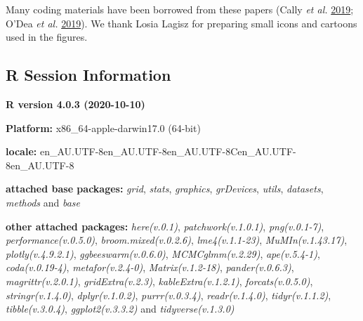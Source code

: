 \documentclass[
]{article}
\newenvironment{Shaded}{\begin{snugshade}}{\end{snugshade}}
\newcommand{\CommentTok}[1]{\textcolor[rgb]{0.56,0.35,0.01}{\textit{#1}}}
\newcommand{\KeywordTok}[1]{\textcolor[rgb]{0.13,0.29,0.53}{\textbf{#1}}}
\newcommand{\NormalTok}[1]{#1}
\newcommand{\OperatorTok}[1]{\textcolor[rgb]{0.81,0.36,0.00}{\textbf{#1}}}
\newcommand{\StringTok}[1]{\textcolor[rgb]{0.31,0.60,0.02}{#1}}
\begin{document}
Many coding materials have been borrowed from these papers (Cally
\emph{et al.} \protect\hyperlink{ref-cally2019meta}{2019}; O'Dea
\emph{et al.} \protect\hyperlink{ref-odea2018developmental}{2019}). We
thank Losia Lagisz for preparing small icons and cartoons used in the
figures.

\hypertarget{r-session-information}{%
\subsection{R Session Information}\label{r-session-information}}

\begin{Shaded}
\end{Shaded}

\textbf{R version 4.0.3 (2020-10-10)}

\textbf{Platform:} x86\_64-apple-darwin17.0 (64-bit)

\textbf{locale:}
en\_AU.UTF-8\textbar\textbar en\_AU.UTF-8\textbar\textbar en\_AU.UTF-8\textbar\textbar C\textbar\textbar en\_AU.UTF-8\textbar\textbar en\_AU.UTF-8

\textbf{attached base packages:} \emph{grid}, \emph{stats},
\emph{graphics}, \emph{grDevices}, \emph{utils}, \emph{datasets},
\emph{methods} and \emph{base}

\textbf{other attached packages:} \emph{here(v.0.1)},
\emph{patchwork(v.1.0.1)}, \emph{png(v.0.1-7)},
\emph{performance(v.0.5.0)}, \emph{broom.mixed(v.0.2.6)},
\emph{lme4(v.1.1-23)}, \emph{MuMIn(v.1.43.17)},
\emph{plotly(v.4.9.2.1)}, \emph{ggbeeswarm(v.0.6.0)},
\emph{MCMCglmm(v.2.29)}, \emph{ape(v.5.4-1)}, \emph{coda(v.0.19-4)},
\emph{metafor(v.2.4-0)}, \emph{Matrix(v.1.2-18)},
\emph{pander(v.0.6.3)}, \emph{magrittr(v.2.0.1)},
\emph{gridExtra(v.2.3)}, \emph{kableExtra(v.1.2.1)},
\emph{forcats(v.0.5.0)}, \emph{stringr(v.1.4.0)}, \emph{dplyr(v.1.0.2)},
\emph{purrr(v.0.3.4)}, \emph{readr(v.1.4.0)}, \emph{tidyr(v.1.1.2)},
\emph{tibble(v.3.0.4)}, \emph{ggplot2(v.3.3.2)} and
\emph{tidyverse(v.1.3.0)}
\end{document}
